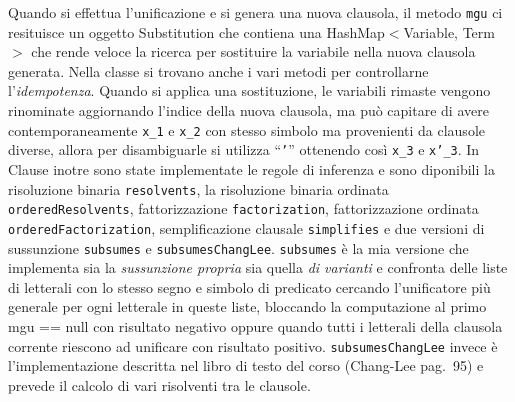 \documentclass[a4paper,11pt]{article} %
\newcommand{\sintassi}{\texttt}
\newcommand{\classe}{\textsf}
\newcommand{\metodo}{\texttt}
\newcommand{\cod}{\lstset{basicstyle=\ttfamily}\lstinline}
\begin{document}
Quando si effettua l'unificazione e si genera una nuova clausola,
il metodo \metodo{mgu} ci resituisce un oggetto 
\classe{Substitution} che contiena
 una \classe{HashMap}$<$\classe{Variable}, \classe{Term}$>$ che
rende veloce la ricerca per sostituire la variabile nella nuova
clausola generata. %
Nella classe si trovano anche i vari metodi per controllarne l'\emph{idempotenza}.
Quando si applica una sostituzione, le variabili rimaste vengono rinominate
aggiornando l'indice della nuova clausola, 
ma può capitare di avere contemporaneamente
\sintassi{x\_1} e \sintassi{x\_2} con stesso simbolo ma provenienti
da clausole diverse, allora per disambiguarle %
si utilizza ``\sintassi{'}'' ottenendo così
\sintassi{x\_3} e \sintassi{x'\_3}.
%
In \classe{Clause} inotre sono state implementate le regole di inferenza e
sono diponibili la risoluzione binaria \metodo{resolvents}, la risoluzione binaria
ordinata \metodo{orderedResolvents}, fattorizzazione \metodo{factorization},
fattorizzazione ordinata \metodo{orderedFactorization}, semplificazione clausale
\metodo{simplifies} e due versioni di sussunzione \metodo{subsumes} e 
\metodo{subsumesChangLee}.
%
\metodo{subsumes} è la
mia versione che implementa sia la \emph{sussunzione propria} sia quella 
\emph{di varianti} e confronta delle liste di letterali con lo 
stesso segno e simbolo di predicato cercando l'unificatore più generale
per ogni letterale in queste liste, bloccando la computazione al primo mgu == null
con risultato negativo oppure quando tutti i letterali della clausola corrente
riescono ad unificare con risultato positivo.
\metodo{subsumesChangLee} invece è l'implementazione descritta nel libro di testo
del corso (Chang-Lee pag.~95) e prevede il calcolo di vari risolventi tra le clausole.
\end{document}
